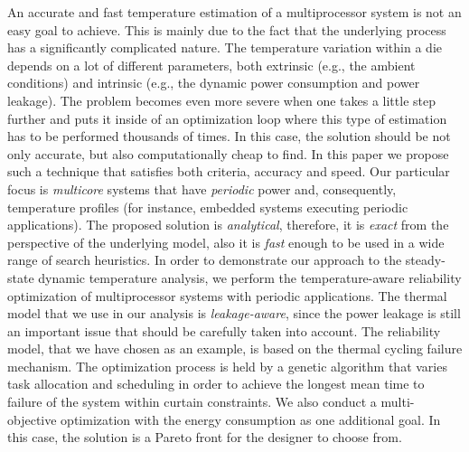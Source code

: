   An accurate and fast temperature estimation of a multiprocessor system is not an easy goal to achieve. This is mainly due to the fact that the underlying process has a significantly complicated nature. The temperature variation within a die depends on a lot of different parameters, both extrinsic (e.g., the ambient conditions) and intrinsic (e.g., the dynamic power consumption and power leakage). The problem becomes even more severe when one takes a little step further and puts it inside of an optimization loop where this type of estimation has to be performed thousands of times. In this case, the solution should be not only accurate, but also computationally cheap to find. In this paper we propose such a technique that satisfies both criteria, accuracy and speed.
  Our particular focus is \emph{multicore} systems that have \emph{periodic} power and, consequently, temperature profiles (for instance, embedded systems executing periodic applications). The proposed solution is \emph{analytical}, therefore, it is \emph{exact} from the perspective of the underlying model, also it is \emph{fast} enough to be used in a wide range of search heuristics. In order to demonstrate our approach to the steady-state dynamic temperature analysis, we perform the temperature-aware reliability optimization of multiprocessor systems with periodic applications.
  The thermal model that we use in our analysis is \emph{leakage-aware}, since the power leakage is still an important issue that should be carefully taken into account. The reliability model, that we have chosen as an example, is based on the thermal cycling failure mechanism.
  The optimization process is held by a genetic algorithm that varies task allocation and scheduling in order to achieve the longest mean time to failure of the system within curtain constraints. We also conduct a multi-objective optimization with the energy consumption as one additional goal. In this case, the solution is a Pareto front for the designer to choose from.

